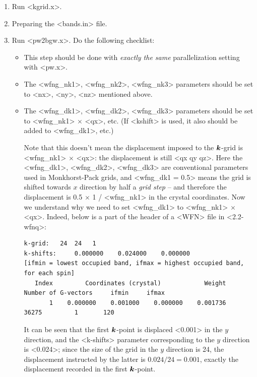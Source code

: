 \documentclass[hyperref, a4paper, 12pt]{report}
\def\texttt#1{<#1>}%
\newcommand{\shortcode}[1]{\texttt{#1}}
\begin{document}
\begin{enumerate}
\begin{enumerate}
        \item Run \shortcode{kgrid.x}.
        \item Preparing the \shortcode{bands.in} file.
        \item Run \shortcode{pw2bgw.x}. Do the following checklist:
        \begin{itemize}
            \item This step should be done 
            with \emph{exactly the same} parallelization setting with \shortcode{pw.x}.
            \item The \shortcode{wfng_nk1}, \shortcode{wfng_nk2}, \shortcode{wfng_nk3} 
            parameters should be set to \shortcode{nx}, \shortcode{ny}, \shortcode{nz}
            mentioned above.
            \item The \shortcode{wfng_dk1}, \shortcode{wfng_dk2}, \shortcode{wfng_dk3} 
            parameters should be set to \shortcode{wfng_nk1} $\times$ \shortcode{qx}, etc.
            (If \shortcode{kshift} is used, 
            it also should be added to \shortcode{wfng_dk1}, etc.)

            Note that this doesn't mean the displacement imposed to the $\vb*{k}$-grid 
            is \shortcode{wfng_nk1} $\times$ \shortcode{qx}:
            the displacement is still \shortcode{qx qy qz}.
            Here the \shortcode{wfng_dk1}, \shortcode{wfng_dk2}, \shortcode{wfng_dk3} 
            are conventional parameters used in Monkhorst-Pack grids,
            and \shortcode{wfng_dk1 = 0.5} means 
            the grid is shifted towards $x$ direction by half a \emph{grid step}
            -- and therefore the displacement is 0.5 $\times$ 1 /  \shortcode{wfng_nk1}
            in the crystal coordinates.
            Now we understand why we need to set 
            \shortcode{wfng_dk1} to \shortcode{wfng_nk1} $\times$ \shortcode{qx}.
            Indeed, below is a part of the header of a \shortcode{WFN} file in \shortcode{2.2-wfnq}:
            \begin{lstlisting}
k-grid:   24  24   1
k-shifts:     0.000000    0.024000    0.000000
[ifmin = lowest occupied band, ifmax = highest occupied band, for each spin]
   Index         Coordinates (crystal)            Weight   Number of G-vectors     ifmin     ifmax
       1    0.000000    0.001000    0.000000    0.001736                 36275         1       120                
            \end{lstlisting}
            It can be seen that the first $\vb*{k}$-point is displaced \shortcode{0.001}
            in the $y$ direction,
            and the \shortcode{k-shifts} parameter corresponding to the $y$ direction is \shortcode{0.024};
            since the size of the grid in the $y$ direction is 24,
            the displacement instructed by the latter is $0.024 / 24 = 0.001$,
            exactly the displacement recorded in the first $\vb*{k}$-point.
        \end{itemize}
    \end{enumerate} 
\end{enumerate}
\end{document}

